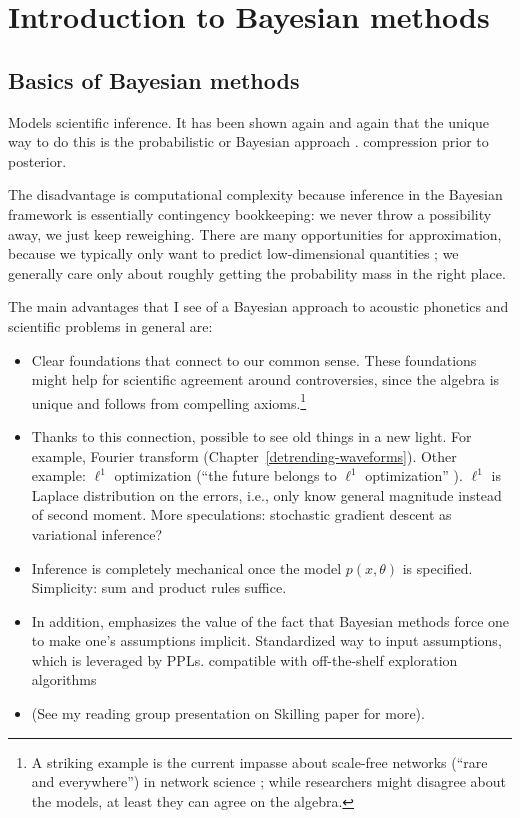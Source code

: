 \chapter{Introduction to Bayesian methods\label{chapter:3}}

\section{Basics of Bayesian methods\label{bayesian-basics}}

Models scientific inference.
It has been shown again and again that the unique way to do this is the probabilistic or Bayesian approach \citep{Jaynes2003,Knuth2012}.
compression prior to posterior.

The disadvantage is computational complexity because inference in the Bayesian framework is essentially contingency bookkeeping: we never throw a possibility away, we just keep reweighing.
There are many opportunities for approximation, because we typically only want to predict low-dimensional quantities \citep{MacKay1996}; we generally care only about roughly getting the probability mass in the right place.

The main advantages that I see of a Bayesian approach to acoustic phonetics and scientific problems in general are:
\begin{itemize}
	\item Clear foundations that connect to our common sense.
	These foundations might help for scientific agreement around controversies, since the algebra is unique and follows from compelling axioms.\footnote{%
		A striking example is the current impasse about scale-free networks (``rare and everywhere'') in network science \citep{Holme2019}; while researchers might disagree about the models, at least they can agree on the algebra.
	}
	
	\item Thanks to this connection, possible to see old things in a new light.
	For example, Fourier transform (Chapter~\ref{detrending-waveforms}). %
	Other example: $\ell^1$ optimization (``the future belongs to $\ell^1$ optimization'' \citep{Strang2019}). $\ell^1$ is Laplace distribution on the errors, i.e., only know general magnitude instead of second moment.
	More speculations: stochastic gradient descent as variational inference? %
	
	\item Inference is completely mechanical once the model $p(x,\theta)$ is specified.
	Simplicity: sum and product rules suffice.
	
	\item In addition, \cite{MacKay2005} emphasizes the value of the fact that Bayesian methods force one to make one's assumptions implicit.
	Standardized way to input assumptions, which is leveraged by PPLs.
	compatible with off-the-shelf exploration algorithms
	
	\item (See my reading group presentation on Skilling paper for more).
\end{itemize}


